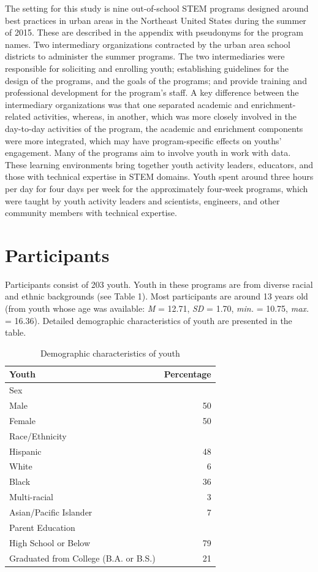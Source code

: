 \documentclass[]{book}
\theoremstyle{definition}
\theoremstyle{definition}
\theoremstyle{definition}
\theoremstyle{remark}
\begin{document}
The setting for this study is nine out-of-school STEM programs designed
around best practices in urban areas in the Northeast United States
during the summer of 2015. These are described in the appendix with
pseudonyms for the program names. Two intermediary organizations
contracted by the urban area school districts to administer the summer
programs. The two intermediaries were responsible for soliciting and
enrolling youth; establishing guidelines for the design of the programs,
and the goals of the programs; and provide training and professional
development for the program's staff. A key difference between the
intermediary organizations was that one separated academic and
enrichment-related activities, whereas, in another, which was more
closely involved in the day-to-day activities of the program, the
academic and enrichment components were more integrated, which may have
program-specific effects on youths' engagement. Many of the programs aim
to involve youth in work with data. These learning environments bring
together youth activity leaders, educators, and those with technical
expertise in STEM domains. Youth spent around three hours per day for
four days per week for the approximately four-week programs, which were
taught by youth activity leaders and scientists, engineers, and other
community members with technical expertise.

\section{Participants}\label{participants}

Participants consist of 203 youth. Youth in these programs are from
diverse racial and ethnic backgrounds (see Table 1). Most participants
are around 13 years old (from youth whose age was available: \emph{M} =
12.71, \emph{SD} = 1.70, \emph{min.} = 10.75, \emph{max.} = 16.36).
Detailed demographic characteristics of youth are presented in the
table.

\begin{table}

\caption{\label{tab:unnamed-chunk-3}Demographic characteristics of youth}
\centering
\begin{tabular}[t]{lr}
\toprule
Youth & Percentage\\
\midrule
Sex & \\
Male & 50\\
Female & 50\\
Race/Ethnicity & \\
Hispanic & 48\\
\addlinespace
White & 6\\
Black & 36\\
Multi-racial & 3\\
Asian/Pacific Islander & 7\\
Parent Education & \\
\addlinespace
High School or Below & 79\\
Graduated from College (B.A. or B.S.) & 21\\
\bottomrule
\end{tabular}
\end{table}
\end{document}
